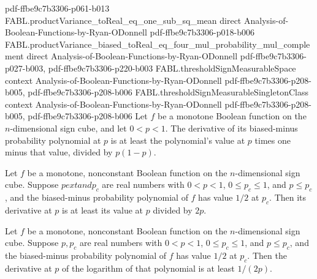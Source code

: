 \begin{theorem}
  {pdf-ffbe9c7b3306-p061-b013}
\proofstep
  {FABL.productVariance_toReal_eq_one_sub_sq_mean}
  {direct}
  {Analysis-of-Boolean-Functions-by-Ryan-ODonnell}
  {pdf-ffbe9c7b3306-p018-b006}
\proofstep
  {FABL.productVariance_biased_toReal_eq_four_mul_probability_mul_complement}
  {direct}
  {Analysis-of-Boolean-Functions-by-Ryan-ODonnell}
  {pdf-ffbe9c7b3306-p027-b003,
    pdf-ffbe9c7b3306-p220-b003}
\proofstep
  {FABL.thresholdSignMeasurableSpace}
  {context}
  {Analysis-of-Boolean-Functions-by-Ryan-ODonnell}
  {pdf-ffbe9c7b3306-p208-b005,
    pdf-ffbe9c7b3306-p208-b006}
\proofstep
  {FABL.thresholdSignMeasurableSingletonClass}
  {context}
  {Analysis-of-Boolean-Functions-by-Ryan-ODonnell}
  {pdf-ffbe9c7b3306-p208-b005,
    pdf-ffbe9c7b3306-p208-b006}
Let $f$ be a monotone Boolean function on the $n$-dimensional sign cube, and let
$0<p<1$. The derivative of its biased-minus probability polynomial at $p$ is at least
the polynomial’s value at $p$ times one minus that value, divided by $p(1-p)$.
\end{theorem}

\begin{theorem}
\label{FABL.deriv_biasedMinusProbabilityPolynomial_ge_div_two_mul}
\leanok
{}
Let $f$ be a monotone, nonconstant Boolean function on the $n$-dimensional sign cube.
Suppose $p	ext{ and }p_c$ are real numbers with $0<p<1$, $0\le p_c\le1$, and $p\le p_c$,
and the biased-minus probability polynomial of $f$ has value $1/2$ at $p_c$. Then its
derivative at $p$ is at least its value at $p$ divided by $2p$.
\end{theorem}

\begin{theorem}
\label{FABL.deriv_log_biasedMinusProbabilityPolynomial_ge}
\leanok
{}
Let $f$ be a monotone, nonconstant Boolean function on the $n$-dimensional sign cube.
Suppose $p,p_c$ are real numbers with $0<p<1$, $0\le p_c\le1$, and $p\le p_c$, and the
biased-minus probability polynomial of $f$ has value $1/2$ at $p_c$. Then the derivative
at $p$ of the logarithm of that polynomial is at least $1/(2p)$.
\end{theorem}

